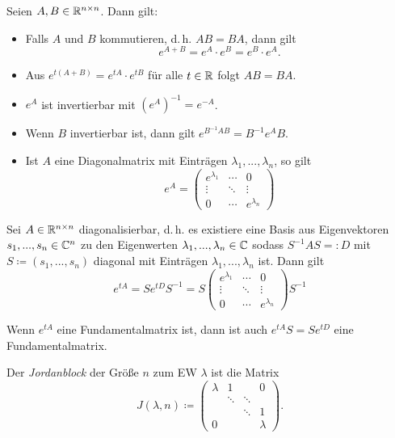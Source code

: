\documentclass{cheat-sheet}
\begin{document}
\begin{satz}
  Seien $A, B \in \mathbb{R}^{n \times n}$. Dann gilt:
  \begin{itemize}
    \item Falls $A$ und $B$ kommutieren, d.\,h. $AB = BA$, dann gilt
    \[ e^{A+B} = e^A \cdot e^B = e^B \cdot e^A. \]
    \item Aus $e^{t(A + B)} = e^{tA} \cdot e^{tB}$ für alle $t \in \mathbb{R}$ folgt $AB = BA$.
    \item $e^{A}$ ist invertierbar mit $(e^A)^{-1} = e^{-A}$.
    \item Wenn $B$ invertierbar ist, dann gilt $e^{B^{-1}AB} = B^{-1} e^A B$.
    \item Ist $A$ eine Diagonalmatrix mit Einträgen $\lambda_1, ..., \lambda_n$, so gilt
    \[ e^A = \begin{pmatrix} e^{\lambda_1} & \cdots & 0 \\ \vdots & \ddots & \vdots \\ 0 & \cdots & e^{\lambda_n} \end{pmatrix} \]
  \end{itemize}
\end{satz}

\begin{satz}
  Sei $A \in \mathbb{R}^{n \times n}$ diagonalisierbar, d.\,h. es existiere eine Basis aus Eigenvektoren $s_1, ..., s_n \in \mathbb{C}^n$ zu den Eigenwerten $\lambda_1, ..., \lambda_n \in \mathbb{C}$ sodass $S^{-1} A S =: D$ mit $S \coloneqq (s_1, ..., s_n)$ diagonal mit Einträgen $\lambda_1, ..., \lambda_n$ ist. Dann gilt
  \[ e^{tA} = S e^{tD} S^{-1} = S \begin{pmatrix} e^{\lambda_1} & \cdots & 0 \\ \vdots & \ddots & \vdots \\ 0 & \cdots & e^{\lambda_n} \end{pmatrix} S^{-1} \]
\end{satz}

\begin{bem}
  Wenn $e^{tA}$ eine Fundamentalmatrix ist, dann ist auch $e^{tA} S = S e^{tD}$ eine Fundamentalmatrix.
\end{bem}



\begin{defn}
  Der \emph{Jordanblock} der Größe $n$ zum EW $\lambda$ ist die Matrix
  \[ J(\lambda, n) \coloneqq \begin{pmatrix}
    \lambda & 1 & & 0 \\
    & \ddots & \ddots & \\
    & & \ddots & 1 \\
    0 & & & \lambda
  \end{pmatrix}. \]
\end{defn}
\end{document}
